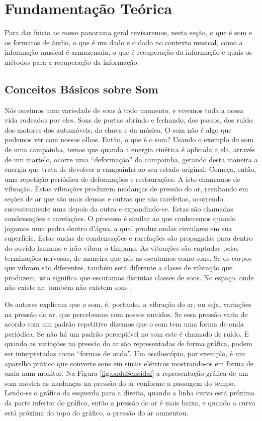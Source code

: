 \chapter{Fundamentação Teórica}
Para dar ínicio ao nosso panorama geral revisaremos, nesta seção, o que é som e os formatos de áudio, o que é um dado e o dado no contexto musical, como a informação musical é armazenada, o que é recuperação da informação e quais os métodos para a recuperação da informação.

\section{Conceitos Básicos sobre Som}
Nós ouvimos uma variedade de sons à todo momento, e vivemos toda a nossa vida rodeados por eles. Sons de portas abrindo e fechando, dos passos, dos ruído dos motores dos automóveis, da chuva e da música. O som não é algo que podemos ver com nossos olhos. Então, o que é o som? Usando o exemplo do som de uma campainha, temos que quando a energia cinética é aplicada a ela, através de um martelo, ocorre uma “deformação” da campainha, gerando desta maneira a energia que trata de devolver a campainha ao seu estado original. Começa, então, uma repetição periódica de deformações e restaurações. A isto chamamos de vibração. Estas vibrações produzem mudanças de pressão do ar, resultando em seções de ar que são mais densas e outras que são rarefeitas, ocorrendo sucessivamente uma depois da outra e expandindo-se. Estas são chamadas condensações e rarefações. O processo é similar ao que conhecemos quando jogamos uma pedra dentro d’água, a qual produz ondas circulares em sua superfície. Estas ondas de condensações e rarefações são propagadas para dentro do ouvido humano e irão vibrar o tímpano. As vibrações são captadas pelas terminações nervosas, de maneira que nós as escutamos como sons. Se os corpos que vibram são diferentes, também será diferente a classe de vibração que produzem, isto significa que escutamos distintas classes de sons. No espaço, onde não existe ar, também não existem sons \cite{miletto2004}.

Os autores explicam que o som, é, portanto, a vibração do ar, ou seja, variações na pressão do ar, que percebemos com nossos ouvidos. Se essa pressão varia de acordo com um padrão repetitivo dizemos que o som tem uma forma de onda periódica. Se não há um padrão perceptível no som este é chamado de ruído. E quando as variações na pressão do ar são representadas de forma gráfica, podem ser interpretadas como “formas de onda”. Um osciloscópio, por exemplo, é um aparelho prático que converte sons em sinais elétricos mostrando-os em forma de onda num monitor. Na Figura \ref{fig:ondaSenoidal} a representação gráfica de um som mostra as mudanças na pressão do ar conforme a passagem do tempo. Lendo-se o gráfico da esquerda para a direita, quando a linha curva está próxima da parte inferior do gráfico, então a pressão do ar é mais baixa, e quando a curva está próxima do topo do gráfico, a pressão do ar aumentou.

